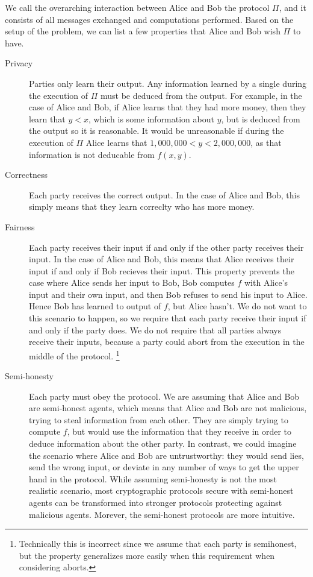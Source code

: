 We call the overarching interaction between Alice and Bob the protocol $\Pi$, and it consists of all messages exchanged and computations performed.
Based on the setup of the problem, we can list a few properties that Alice and Bob wish $\Pi$ to have.
\begin{description}
    \item[Privacy] 
        Parties only learn their output. 
        Any information learned by a single during the execution of $\Pi$ must be deduced from the output. 
        For example, in the case of Alice and Bob, if Alice learns that they had more money, then they learn that $y < x$, which is some information about $y$, but is deduced from the output so it is reasonable. 
        It would be unreasonable if during the execution of $\Pi$ Alice learns that $1,000,000 < y < 2,000,000$, as that information is not deducable from $f(x,y)$.
    \item[Correctness] 
        Each party receives the correct output.
        In the case of Alice and Bob, this simply means that they learn correclty who has more money.
    \item[Fairness] 
        Each party receives their input if and only if the other party receives their input.
        In the case of Alice and Bob, this means that Alice receives their input if and only if Bob recieves their input.
        This property prevents the case where Alice sends her input to Bob, Bob computes $f$ with Alice's input and their own input, and then Bob refuses to send his input to Alice. 
        Hence Bob has learned to output of $f$, but Alice hasn't. 
        We do not want to this scenario to happen, so we require that each party receive their input if and only if the party does. 
        We do not require that all parties always receive their inputs, because a party could abort from the execution in the middle of the protocol.
        \footnote{Technically this is incorrect since we assume that each party is semihonest, but the property generalizes more easily when this requirement when considering aborts.}
    \item[Semi-honesty]
        Each party must obey the protocol.
        We are assuming that Alice and Bob are semi-honest agents, which means that Alice and Bob are not malicious, trying to steal information from each other. 
        They are simply trying to compute $f$, but would use the information that they receive in order to deduce information about the other party.
        In contrast, we could imagine the scenario where Alice and Bob are untrustworthy: they would send lies, send the wrong input, or deviate in any number of ways to get the upper hand in the protocol.
        While assuming semi-honesty is not the most realistic scenario, most cryptographic protocols secure with semi-honest agents can be transformed into stronger protocols protecting against malicious agents.
        Morever, the semi-honest protocols are more intuitive.
\end{description}
